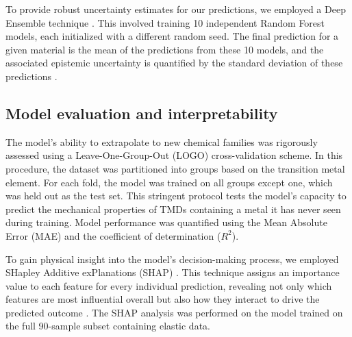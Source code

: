 \documentclass[]{article}
\begin{document}
To provide robust uncertainty estimates for our predictions, we employed a Deep Ensemble technique \citep{Tavazza_2021,tavazza2021uncertainty,varivoda2022materialspropertypredictionuncertainty,jacobs2024machinelearningmaterialsproperties,Li_2024,Schreck_2024,dale2025activelearningfailsuncalibrated,korolev2022universal,sun2021datadrivendiscoveryinterpretablecausal}. This involved training 10 independent Random Forest models, each initialized with a different random seed. The final prediction for a given material is the mean of the predictions from these 10 models, and the associated epistemic uncertainty is quantified by the standard deviation of these predictions .

\subsection{Model evaluation and interpretability}
The model's ability to extrapolate to new chemical families was rigorously assessed using a Leave-One-Group-Out (LOGO) cross-validation scheme. In this procedure, the dataset was partitioned into groups based on the transition metal element. For each fold, the model was trained on all groups except one, which was held out as the test set. This stringent protocol tests the model's capacity to predict the mechanical properties of TMDs containing a metal it has never seen during training.\citep{Li_2023,Karunaratne_2025} Model performance was quantified using the Mean Absolute Error (MAE) and the coefficient of determination ($R^2$).\citep{Borg_2023}

To gain physical insight into the model's decision-making process, we employed SHapley Additive exPlanations (SHAP) \citep{aas2020explainingindividualpredictionsfeatures,redelmeier2020explainingpredictivemodelsmixed,heskes2020causalshapleyvaluesexploiting,campbell2021exactshapleyvalueslocal,Nohara_2022,olsen2023precisionindividualshapleyvalue,Zhao_2024,whitehouse2026statisticalinferencelearningshapley,lin2026comparativeanalysismachinelearning}. This technique assigns an importance value to each feature for every individual prediction, revealing not only which features are most influential overall but also how they interact to drive the predicted outcome \citep{aas2020explainingindividualpredictionsfeatures,heskes2020causalshapleyvaluesexploiting,campbell2021exactshapleyvalueslocal,Nohara_2022,olsen2023precisionindividualshapleyvalue,Zhao_2024,whitehouse2026statisticalinferencelearningshapley}. The SHAP analysis was performed on the model trained on the full 90-sample subset containing elastic data.
\end{document}
